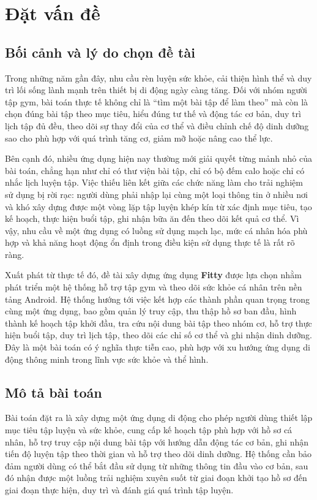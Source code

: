 \chapter{Đặt vấn đề}

\section{Bối cảnh và lý do chọn đề tài}

Trong những năm gần đây, nhu cầu rèn luyện sức khỏe, cải thiện hình thể và duy trì lối sống lành mạnh trên thiết bị di động ngày càng tăng. Đối với nhóm người tập gym, bài toán thực tế không chỉ là ``tìm một bài tập để làm theo'' mà còn là chọn đúng bài tập theo mục tiêu, hiểu đúng tư thế và động tác cơ bản, duy trì lịch tập đủ đều, theo dõi sự thay đổi của cơ thể và điều chỉnh chế độ dinh dưỡng sao cho phù hợp với quá trình tăng cơ, giảm mỡ hoặc nâng cao thể lực.

Bên cạnh đó, nhiều ứng dụng hiện nay thường mới giải quyết từng mảnh nhỏ của bài toán, chẳng hạn như chỉ có thư viện bài tập, chỉ có bộ đếm calo hoặc chỉ có nhắc lịch luyện tập. Việc thiếu liên kết giữa các chức năng làm cho trải nghiệm sử dụng bị rời rạc: người dùng phải nhập lại cùng một loại thông tin ở nhiều nơi và khó xây dựng được một vòng lặp tập luyện khép kín từ xác định mục tiêu, tạo kế hoạch, thực hiện buổi tập, ghi nhận bữa ăn đến theo dõi kết quả cơ thể. Vì vậy, nhu cầu về một ứng dụng có luồng sử dụng mạch lạc, mức cá nhân hóa phù hợp và khả năng hoạt động ổn định trong điều kiện sử dụng thực tế là rất rõ ràng.

Xuất phát từ thực tế đó, đề tài xây dựng ứng dụng \textbf{Fitty} được lựa chọn nhằm phát triển một hệ thống hỗ trợ tập gym và theo dõi sức khỏe cá nhân trên nền tảng Android. Hệ thống hướng tới việc kết hợp các thành phần quan trọng trong cùng một ứng dụng, bao gồm quản lý truy cập, thu thập hồ sơ ban đầu, hình thành kế hoạch tập khởi đầu, tra cứu nội dung bài tập theo nhóm cơ, hỗ trợ thực hiện buổi tập, duy trì lịch tập, theo dõi các chỉ số cơ thể và ghi nhận dinh dưỡng. Đây là một bài toán có ý nghĩa thực tiễn cao, phù hợp với xu hướng ứng dụng di động thông minh trong lĩnh vực sức khỏe và thể hình.

\section{Mô tả bài toán}

Bài toán đặt ra là xây dựng một ứng dụng di động cho phép người dùng thiết lập mục tiêu tập luyện và sức khỏe, cung cấp kế hoạch tập phù hợp với hồ sơ cá nhân, hỗ trợ truy cập nội dung bài tập với hướng dẫn động tác cơ bản, ghi nhận tiến độ luyện tập theo thời gian và hỗ trợ theo dõi dinh dưỡng. Hệ thống cần bảo đảm người dùng có thể bắt đầu sử dụng từ những thông tin đầu vào cơ bản, sau đó nhận được một luồng trải nghiệm xuyên suốt từ giai đoạn khởi tạo hồ sơ đến giai đoạn thực hiện, duy trì và đánh giá quá trình tập luyện.

